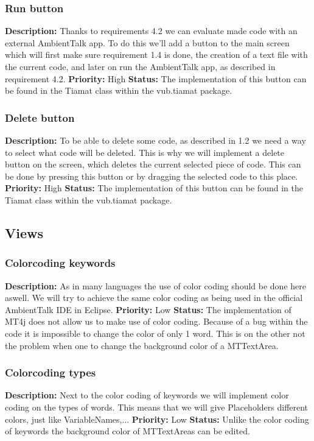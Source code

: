 \documentclass[a4paper,12pt]{report}
\begin{document}
\subsubsection{Run button}
\textbf{Description: } Thanks to requirements 4.2 we can evaluate made code with an external AmbientTalk app. To do this we'll add a button
to the main screen which will first make sure requirement 1.4 is done, the creation of a text file with the current code, and later on run the AmbientTalk app, as described in requirement 4.2.
\textbf{Priority:} High \newline
\textbf{Status: } The implementation of this button can be found in the Tiamat class within the vub.tiamat package.\newline
\subsubsection{Delete button}
\textbf{Description: } To be able to delete some code, as described in 1.2 we need a way to select what code will be deleted. This is why we will
implement a delete button on the screen, which deletes the current selected piece of code. This can be done by pressing this button or by dragging the selected code to this place. 
\textbf{Priority:} High \newline
\textbf{Status: } The implementation of this button can be found in the Tiamat class within the vub.tiamat package. \newline
\subsection{Views}
\subsubsection{Colorcoding keywords}
\textbf{Description: }As in many languages the use of color coding should be done here aswell. We  will try to achieve the same color coding as
being used in the official AmbientTalk IDE in Eclipse. \newline
\textbf{Priority:} Low \newline
\textbf{Status: } The implementation of MT4j does not allow us to make use of color coding. Because of a bug within the code it is impossible
to change the color of only 1 word. This is on the other not the problem when one to change the background color of a MTTextArea. \newline
\subsubsection{Colorcoding types}
\textbf{Description: } Next to the color coding of keywords we will implement color coding on the types of words. This means that we will give
Placeholders different colors, just like VariableNames,... \newline
\textbf{Priority:} Low \newline
\textbf{Status: } Unlike the color coding of keywords the background color of MTTextAreas can be edited.\newline
\end{document}
